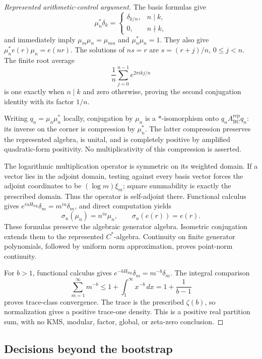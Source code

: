 \begin{proof}[Represented arithmetic-control argument]
The basis formulas give
\[
 \mu_n^*\delta_k=
 \begin{cases}\delta_{k/n},&n\mid k,\\0,&n\nmid k,
 \end{cases}
\]
and immediately imply $\mu_m\mu_n=\mu_{mn}$ and
$\mu_n^*\mu_n=1$. They also give
$\mu_n^*e(r)\mu_n=e(nr)$. The solutions of $ns=r$ are
$s=(r+j)/n$, $0\leq j<n$. The finite root average
\[
 \frac1n\sum_{j=0}^{n-1}e^{2\pi i kj/n}
\]
is one exactly when $n\mid k$ and zero otherwise, proving the second
conjugation identity with its factor $1/n$.

Writing $q_n=\mu_n\mu_n^*$ locally, conjugation by $\mu_n$ is a
$*$-isomorphism onto
$q_nA_{\mathrm{BC}}^{\mathrm{rep}}q_n$: its inverse on the corner is compression by
$\mu_n^*$. The latter compression preserves the represented algebra, is
unital, and is completely positive by amplified quadratic-form positivity.
No multiplicativity of this compression is asserted.

The logarithmic multiplication operator is symmetric on its weighted domain.
If a vector lies in the adjoint domain, testing against every basis vector
forces the adjoint coordinates to be $(\log m)\xi_m$; square summability is
exactly the prescribed domain. Thus the operator is self-adjoint there.
Functional calculus gives
$e^{iuH_{\log}}\delta_m=m^{iu}\delta_m$, and direct computation yields
\[
 \sigma_u(\mu_n)=n^{iu}\mu_n,\qquad \sigma_u(e(r))=e(r).
\]
These formulas preserve the algebraic generator algebra. Isometric
conjugation extends them to the represented $C^*$-algebra. Continuity on
finite generator polynomials, followed by uniform norm approximation, proves
point-norm continuity.

For $b>1$, functional calculus gives
$e^{-bH_{\log}}\delta_m=m^{-b}\delta_m$. The integral comparison
\[
 \sum_{m=1}^{\infty}m^{-b}\leq1+\int_1^\infty x^{-b}\,dx
 =1+\frac1{b-1}
\]
proves trace-class convergence. The trace is the prescribed
$\zeta(b)$, so normalization gives a positive trace-one density. This is a
positive real partition sum, with no KMS, modular, factor, global, or
zeta-zero conclusion.
\end{proof}

\subsection{Decisions beyond the bootstrap}

